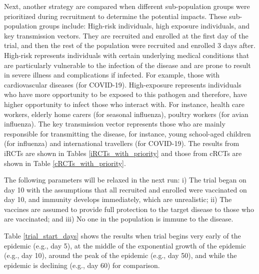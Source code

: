 \documentclass[a4paper]{article}
\begin{document}
	Next, another strategy are compared when different sub-population groups were prioritized during recruitment to determine the potential impacts. These sub-population groups include: High-risk individuals, high exposure individuals, and key transmission vectors. They are recruited and enrolled at the first day of the trial, and then the rest of the population were recruited and enrolled 3 days after. High-risk represents individuals with certain underlying medical conditions that are particularly vulnerable to the infection of the disease and are prone to result in severe illness and complications if infected. For example, those with cardiovascular diseases (for COVID-19). High-exposure represents individuals who have more opportunity to be exposed to this pathogen and therefore, have higher opportunity to infect those who interact with. For instance, health care workers, elderly home carers (for seasonal influenza), poultry workers (for avian influenza). The key transmission vector represents those who are mainly responsible for transmitting the disease, for instance, young school-aged children (for influenza) and international travellers (for COVID-19). The results from iRCTs are shown in Tables \ref{iRCTs_with_priority} and those from cRCTs are shown in Table \ref{cRCTs_with_priority}.
	
	The following parameters will be relaxed in the next run: i) The trial began on day 10 with the assumptions that all recruited and enrolled were vaccinated on day 10, and immunity develops immediately, which are unrealistic; ii) The vaccines are assumed to provide full protection to the target disease to those who are vaccinated; and iii) No one in the population is immune to the disease.
	
	Table \ref{trial_start_days} shows the results when trial begins very early of the epidemic (e.g., day 5), at the middle of the exponential growth of the epidemic (e.g., day 10), around the peak of the epidemic (e.g., day 50), and while the epidemic is declining (e.g., day 60) for comparison.
	
\end{document}
